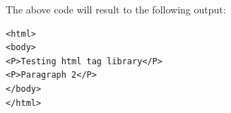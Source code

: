 \documentclass[12pt,a4paper]{exam}
\newcommand{\code}{/Users/keith/Documents/Courses/sdp/repo/worksheets/dp-two/kotlin/src}
\begin{document}
\begin{questions}
\inputminted{scala}{\code/composite/TestCompositePattern.kt}

The above code will result to the following output:
\begin{Verbatim}
<html>
<body>
<P>Testing html tag library</P>
<P>Paragraph 2</P>
</body>
</html>	
\end{Verbatim}

\end{questions}
\end{document}
